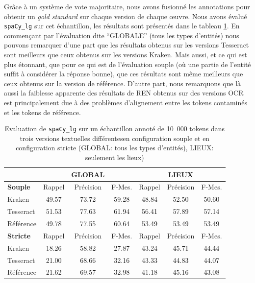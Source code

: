Grâce à un système de vote majoritaire, nous avons fusionné les annotations pour obtenir un \textit{gold standard} sur chaque version de chaque œuvre.
 Nous avons évalué \texttt{spaCy\_lg} sur cet échantillon, les résultats sont présentés dans le tableau \ref{tab:eval-supervise}.
 En commençant par l'évaluation dite ``GLOBALE'' (tous les types d'entités) nous pouvons remarquer d'une part que les résultats obtenus sur les versions Tesseract sont meilleurs que ceux obtenus sur les versions Kraken. Mais aussi, et ce qui est plus étonnant, que pour ce qui est de l'évaluation souple (où une partie de l'entité suffit à considérer la réponse bonne), que ces résultats sont même meilleurs que ceux obtenus sur la version de référence.
  D'autre part, nous remarquons que là aussi la faiblesse apparente des résultats de REN obtenus sur des versions OCR est principalement due à des problèmes d'alignement entre les tokens contaminés et les tokens de référence. 
\begin{table}[h!]
\scriptsize{\begin{tabular}{l|ccc|ccc}
 &		&	GLOBAL	&		&		&	LIEUX	&		\\
\hline
 \hline
\textbf{Souple}	&	Rappel		&Précision	&	F-Mes.	&	Rappel&		Précision		&F-Mes.	\\
 \hline
Kraken	&	49.57	&	73.72 	&	59.28	&	48.84	&	52.50	&	50.60	\\
													
Tesseract	&	51.53	&	77.63	&	61.94	&	56.41	&	57.89	&	57.14	\\
													
Référence	&	49.78	&	77.55	&	60.64	&	53.49	&	53.49	&	53.49	\\
\hline
\hline
\textbf{Stricte}	&	Rappel		&Précision	&	F-Mes.	&	Rappel&		Précision		&F-Mes.	 \\
\hline
Kraken	&	18.26	&	58.82	&	27.87	&	43.24	&	45.71	&	44.44	\\
Tesseract	&	21.00	&	68.66	&	32.16	&	43.33	&	44.83	&	44.07	\\
Référence	&	21.62	&	69.57	&	32.98	&	41.18	&	45.16	&	43.08	\\
\hline
\hline
\end{tabular}}
\caption{Evaluation de \texttt{spaCy\_lg} sur un échantillon annoté de 10~000 tokens dans trois versions textuelles différentes\label{tab:eval-supervise} en configuration souple et en configuration stricte (GLOBAL: tous les types d'entités), LIEUX: seulement les lieux)}
 \end{table}


